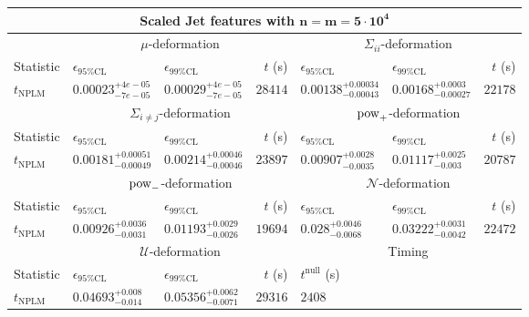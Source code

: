 \begin{tabular}{l|llr|llr}
	\toprule
	\multicolumn{7}{c}{{\bf Scaled Jet features with $\mathbf{n=m=5\cdot 10^{4}}$}} \\
	\toprule
	\multicolumn{1}{c}{} & \multicolumn{3}{c}{$\mu$-deformation} & \multicolumn{3}{c}{$\Sigma_{ii}$-deformation} \\
	Statistic & $\epsilon_{95\%\mathrm{CL}}$ & $\epsilon_{99\%\mathrm{CL}}$ & $t$ (s) & $\epsilon_{95\%\mathrm{CL}}$ & $\epsilon_{99\%\mathrm{CL}}$ & $t$ (s) \\
	\midrule
	$t_{\mathrm{NPLM}}$ & $0.00023_{-7e-05}^{+4e-05}$ & $0.00029_{-7e-05}^{+4e-05}$ & $28414$ & $0.00138_{-0.00043}^{+0.00034}$ & $0.00168_{-0.00027}^{+0.0003}$ & $22178$ \\
	\toprule
	\multicolumn{1}{c}{} & \multicolumn{3}{c}{$\Sigma_{i\neq j}$-deformation} & \multicolumn{3}{c}{$\rm{pow}_{+}$-deformation} \\
	Statistic & $\epsilon_{95\%\mathrm{CL}}$ & $\epsilon_{99\%\mathrm{CL}}$ & $t$ (s) & $\epsilon_{95\%\mathrm{CL}}$ & $\epsilon_{99\%\mathrm{CL}}$ & $t$ (s) \\
	\midrule
	$t_{\mathrm{NPLM}}$ & $0.00181_{-0.00049}^{+0.00051}$ & $0.00214_{-0.00046}^{+0.00046}$ & $23897$ & $0.00907_{-0.0035}^{+0.0028}$ & $0.01117_{-0.003}^{+0.0025}$ & $20787$ \\
	\toprule
	\multicolumn{1}{c}{} & \multicolumn{3}{c}{$\rm{pow}_{-}$-deformation} & \multicolumn{3}{c}{$\mathcal{N}$-deformation} \\
	Statistic & $\epsilon_{95\%\mathrm{CL}}$ & $\epsilon_{99\%\mathrm{CL}}$ & $t$ (s) & $\epsilon_{95\%\mathrm{CL}}$ & $\epsilon_{99\%\mathrm{CL}}$ & $t$ (s) \\
	\midrule
	$t_{\mathrm{NPLM}}$ & $0.00926_{-0.0031}^{+0.0036}$ & $0.01193_{-0.0026}^{+0.0029}$ & $19694$ & $0.028_{-0.0068}^{+0.0046}$ & $0.03222_{-0.0042}^{+0.0031}$ & $22472$ \\
	\toprule
	\multicolumn{1}{c}{} & \multicolumn{3}{c}{$\mathcal{U}$-deformation} & \multicolumn{3}{c}{Timing} \\
	Statistic & $\epsilon_{95\%\mathrm{CL}}$ & $\epsilon_{99\%\mathrm{CL}}$ & $t$ (s) & $t^{\mathrm{null}}$ (s) \\
	\midrule
	$t_{\mathrm{NPLM}}$ & $0.04693_{-0.014}^{+0.008}$ & $0.05356_{-0.0071}^{+0.0062}$ & $29316$ & $2408$ \\
	\bottomrule
\end{tabular}